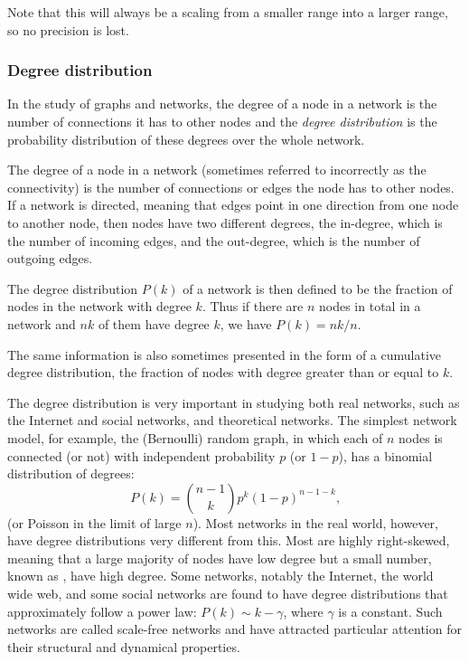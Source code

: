       Note that this will always be a scaling from a smaller range into a larger range, so no precision is lost.
      
    \subsubsection{Degree distribution}
    
      In the study of graphs and networks, the degree of a node in a network is the number of connections it has to other nodes and the \emph{degree distribution} is the probability distribution of these degrees over the whole network.
      
      The degree of a node in a network (sometimes referred to incorrectly as the connectivity) is the number of connections or edges the node has to other nodes. If a network is directed, meaning that edges point in one direction from one node to another node, then nodes have two different degrees, the in-degree, which is the number of incoming edges, and the out-degree, which is the number of outgoing edges.

      The degree distribution $P(k)$ of a network is then defined to be the fraction of nodes in the network with degree $k$. Thus if there are $n$ nodes in total in a network and $nk$ of them have degree $k$, we have $P(k) = nk/n$.

      The same information is also sometimes presented in the form of a cumulative degree distribution, the fraction of nodes with degree greater than or equal to $k$.
      
      The degree distribution is very important in studying both real networks, such as the Internet and social networks, and theoretical networks. The simplest network model, for example, the (Bernoulli) random graph, in which each of $n$ nodes is connected (or not) with independent probability $p$ (or $1 − p$), has a binomial distribution of degrees:
      \begin{equation}
        P(k) = \binom{n-1}{k} p^k (1 - p)^{n-1-k}\mbox{,}
      \end{equation}
      (or Poisson in the limit of large $n$). Most networks in the real world, however, have degree distributions very different from this. Most are highly right-skewed, meaning that a large majority of nodes have low degree but a small number, known as , have high degree. Some networks, notably the Internet, the world wide web, and some social networks are found to have degree distributions that approximately follow a power law: $P(k) \sim k−\gamma$, where $\gamma$ is a constant. Such networks are called scale-free networks and have attracted particular attention for their structural and dynamical properties.
      
